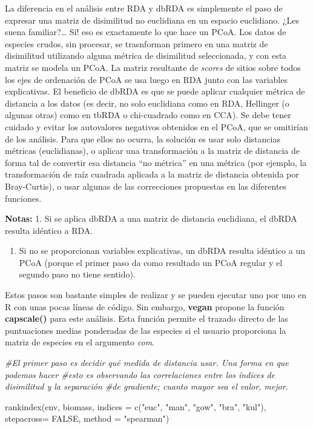 \documentclass[
]{book}
\newenvironment{Shaded}{\begin{snugshade}}{\end{snugshade}}
\newcommand{\AttributeTok}[1]{\textcolor[rgb]{0.77,0.63,0.00}{#1}}
\newcommand{\CommentTok}[1]{\textcolor[rgb]{0.56,0.35,0.01}{\textit{#1}}}
\newcommand{\ConstantTok}[1]{\textcolor[rgb]{0.00,0.00,0.00}{#1}}
\newcommand{\FunctionTok}[1]{\textcolor[rgb]{0.00,0.00,0.00}{#1}}
\newcommand{\NormalTok}[1]{#1}
\newcommand{\StringTok}[1]{\textcolor[rgb]{0.31,0.60,0.02}{#1}}
\providecommand{\tightlist}{%
  \setlength{\itemsep}{0pt}\setlength{\parskip}{0pt}}
\begin{document}
La diferencia en el análisis entre RDA y dbRDA es simplemente el paso de expresar una matriz de disimilitud no euclidiana en un espacio euclidiano. ¿Les suena familiar?\ldots{} Sí! eso es exactamente lo que hace un PCoA.
Los datos de especies crudos, sin procesar, se trasnforman primero en una matriz de disimilitud utilizando alguna métrica de disimilitud seleccionada, y con esta matriz se modela un PCoA. La matriz resultante de \emph{scores} de sitios sobre todos los ejes de ordenación de PCoA se usa luego en RDA junto con las variables explicativas. El beneficio de dbRDA es que se puede aplicar cualquier métrica de distancia a los datos (es decir, no solo euclidiana como en RDA, Hellinger (o algunas otras) como en tbRDA o chi-cuadrado como en CCA). Se debe tener cuidado y evitar los autovalores negativos obtenidos en el PCoA, que se omitirían de los análisis. Para que ellos no ocurra, la solución es usar solo distancias métricas (euclidianas), o aplicar una transformación a la matriz de distancia de forma tal de convertir esa distancia ``no métrica'' en una métrica (por ejemplo, la transformación de raíz cuadrada aplicada a la matriz de distancia obtenida por Bray-Curtis), o usar algunas de las correcciones propuestas en las diferentes funciones.

\textbf{Notas:}
1. Si se aplica dbRDA a una matriz de distancia euclidiana, el dbRDA resulta idéntico a RDA.

\begin{enumerate}
\def\labelenumi{\arabic{enumi}.}
\setcounter{enumi}{1}
\tightlist
\item
  Si no se proporcionan variables explicativas, un dbRDA resulta idéntico a un PCoA
  (porque el primer paso da como resultado un PCoA regular y el segundo paso no tiene sentido).
\end{enumerate}

Estos pasos son bastante simples de realizar y se pueden ejecutar uno por uno en R con unas pocas líneas de código. Sin embargo, \textbf{vegan} propone la función \textbf{capscale()} para este análisis. Esta función permite el trazado directo de las puntuaciones medias ponderadas de las especies si el usuario proporciona la matriz de especies en el argumento \emph{com}.

\begin{Shaded}
\begin{Highlighting}[]
\CommentTok{\#El primer paso es decidir qué medida de distancia usar. Una forma en que podemos hacer \#esto es observando las correlaciones entre los índices de disimilitud y la separación \#de gradiente; cuanto mayor sea el valor, mejor.}

\FunctionTok{rankindex}\NormalTok{(env, biomass, }\AttributeTok{indices =} \FunctionTok{c}\NormalTok{(}\StringTok{"euc"}\NormalTok{, }\StringTok{"man"}\NormalTok{, }\StringTok{"gow"}\NormalTok{, }\StringTok{"bra"}\NormalTok{, }\StringTok{"kul"}\NormalTok{), }\AttributeTok{stepacross=} \ConstantTok{FALSE}\NormalTok{, }\AttributeTok{method =} \StringTok{"spearman"}\NormalTok{)}
\end{Highlighting}
\end{Shaded}
\end{document}
